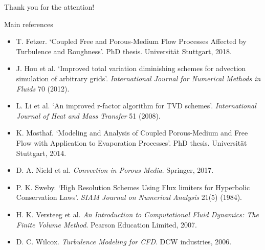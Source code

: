 \documentclass{beamer}
\begin{document}
\begin{frame}
	\centering
	{\LARGE Thank you for the attention!}
	
\end{frame}
\appendix
\begin{frame}{Main references}
\begin{itemize}
	\footnotesize
	\item T. Fetzer. `Coupled Free and Porous-Medium Flow Processes Affected by 
	Turbulence and Roughness'. PhD thesis. Universit\"at Stuttgart, 2018.
	\item J. Hou et al. `Improved total variation diminishing schemes for 
	advection simulation of arbitrary grids'. \emph{International Journal for 
	Numerical Methods in Fluids} 70 (2012).
	\item L. Li et al. `An improved r-factor algorithm for TVD schemes'. 
	\emph{International Journal of Heat and Mass Transfer} 51 (2008).
	\item K. Mosthaf. `Modeling and Analysis of Coupled  Porous-Medium and Free 
	Flow with Application to Evaporation Processes'. PhD thesis. Universit\"at 
	Stuttgart, 2014.
	\item D. A. Nield et al. \emph{Convection in Porous Media}. Springer, 2017.
	\item P. K. Sweby. `High Resolution Schemes Using Flux limiters for 
	Hyperbolic Conservation Laws'. \emph{SIAM Journal on Numerical Analysis} 
	21(5) (1984).
	\item H. K. Versteeg et al. \emph{An Introduction to Computational Fluid 
	Dynamics: The Finite Volume Method}. Pearson Education Limited, 2007.
	\item D. C. Wilcox. \emph{Turbulence Modeling for CFD}. DCW industries, 
	2006. 
\end{itemize}
\end{frame}
\end{document}
